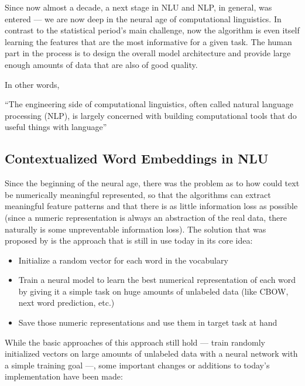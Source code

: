 Since now almost a decade, a next stage in NLU and NLP, in general, was entered --- we are now deep
in the neural age of computational linguistics.
In contrast to the statistical period's main challenge, now the algorithm is even itself learning 
the features that are the most informative for a given task.
The human part in the process is to design the overall model architecture and provide large enough 
amounts of data that are also of good quality.

In other words, 

``The engineering side of computational linguistics, often called
natural language processing (NLP), is largely concerned with building computational tools that do
useful things with language'' \cite{johnson2009statistical}

\subsection{Contextualized Word Embeddings in NLU}

Since the beginning of the neural age, there was the problem as to how could text be numerically
meaningful represented, so that the algorithms can extract meaningful feature patterns and that
there is as little information loss as possible (since a numeric representation is always an 
abstraction of the real data, there naturally is some unpreventable information loss).
The solution that was proposed by \cite{mikolov2013distributed} is the approach that is still 
in use today in its core idea:

\begin{itemize}
	\item Initialize a random vector for each word in the vocabulary
	\item Train a neural model to learn the best numerical representation of each word
		by giving it a simple task on huge amounts of unlabeled data (like CBOW, next word
		prediction, etc.)
	\item Save those numeric representations and use them in target task at hand
\end{itemize}

While the basic approaches of this approach still hold --- train randomly initialized vectors on
large amounts of unlabeled data with a neural network with a simple training goal ---, some important
changes or additions to today's implementation have been made:

